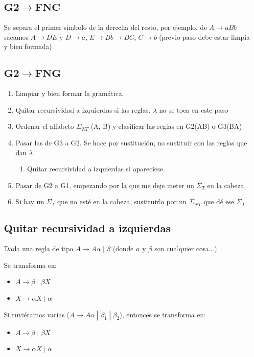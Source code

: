 \documentclass[12pt, twoside, openright]{report} %
\begin{document}
\subsection{$\boldsymbol{G2 \rightarrow FNC}$}
Se separa el primer símbolo de la derecha del resto, por ejemplo, de $A \rightarrow aBb$ sacamos $A \rightarrow DE$ y $D \rightarrow a$, $E \rightarrow Bb \rightarrow BC$, $C \rightarrow b$ (previo paso debe estar limpia y bien formada)

\subsection{$\boldsymbol{G2 \rightarrow FNG}$}
\begin{enumerate}
	\item Limpiar y bien formar la gramática.
	\item Quitar recursividad a izquierdas si las reglas. $\lambda$ no se toca en este paso
	\item Ordenar el alfabeto $\Sigma_{NT}$ (A, B) y clasificar las reglas en G2(AB) o G3(BA)
	\item Pasar las de G3 a G2. Se hace por sustitución, no sustituir con las reglas que dan $\lambda$
	\begin{enumerate}
		\item Quitar recursividad a izquierdas si apareciese.
	\end{enumerate}
	\item Pasar de G2 a G1, empezando por la que me deje meter un $\Sigma_T$ en la cabeza.
	\item Si hay un $\Sigma_T$ que no esté en la cabeza, sustituirlo por un $\Sigma_{NT}$ que dé ese $\Sigma_T$.
\end{enumerate}

\subsection{Quitar recursividad a izquierdas}
Dada una regla de tipo $A \rightarrow A\alpha \; | \; \beta$ (donde $\alpha$ y $\beta$ son cualquier cosa...)

Se transforma en:
\begin{itemize}
	\item $A \rightarrow \beta \; | \; \beta X$
	\item $X \rightarrow \alpha X \; | \; \alpha$
\end{itemize}
Si tuviéramos varias ($A \rightarrow A\alpha \; | \; \beta_1 \; | \; \beta_2$), entonces se transforma en:
\begin{itemize}
	\item $A \rightarrow \beta \; | \; \beta X$
	\item $X \rightarrow \alpha X \; | \; \alpha$
\end{itemize}
\end{document}
